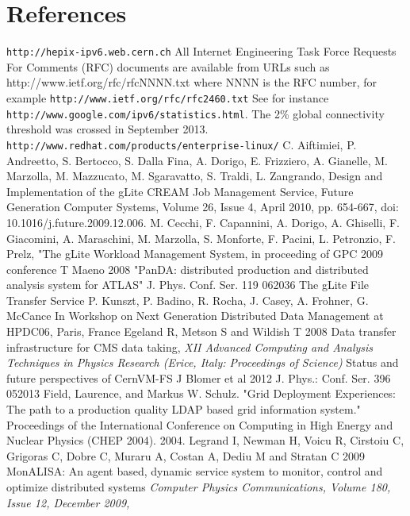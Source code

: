 \section*{References}

\begin{thebibliography}{1}
 {\tt http://hepix-ipv6.web.cern.ch}
 All Internet Engineering Task Force Requests For Comments (RFC) documents are available
from URLs such as http://www.ietf.org/rfc/rfcNNNN.txt where NNNN is the RFC number, for example {\tt http://www.ietf.org/rfc/rfc2460.txt}
 See for instance {\tt http://www.google.com/ipv6/statistics.html}. The 2\% global connectivity threshold was crossed in September 2013.
 {\tt http://www.redhat.com/products/enterprise-linux/}
C. Aiftimiei, P. Andreetto, S. Bertocco, S. Dalla Fina, A. Dorigo, E.
Frizziero, A. Gianelle, M. Marzolla, M. Mazzucato, M. Sgaravatto, S.
Traldi, L. Zangrando, Design and Implementation of the gLite CREAM Job
Management Service, Future Generation Computer Systems, Volume 26, Issue
4, April 2010, pp. 654-667, doi: 10.1016/j.future.2009.12.006.
M. Cecchi, F. Capannini, A. Dorigo, A. Ghiselli, F. Giacomini, A. Maraschini, M. Marzolla, S. Monforte, F. Pacini, L. Petronzio, F. Prelz, "The gLite Workload Management System, in proceeding of GPC 2009 conference
T Maeno 2008 "PanDA: distributed production and distributed analysis
system for ATLAS" J. Phys. Conf. Ser. 119 062036
The gLite File Transfer Service
P. Kunszt, P. Badino, R. Rocha, J. Casey, A. Frohner, G. McCance
In Workshop on Next Generation Distributed Data Management at HPDC06, Paris, France
Egeland R, Metson S and  Wildish T 2008 Data transfer infrastructure for
CMS data taking,  {\it XII Advanced Computing and Analysis Techniques in
Physics Research (Erice, Italy: Proceedings of Science)}
Status and future perspectives of CernVM-FS
J Blomer et al 2012 J. Phys.: Conf. Ser. 396 052013
Field, Laurence, and Markus W. Schulz. "Grid Deployment Experiences: The path to a production quality LDAP based grid information system." Proceedings of the International Conference on Computing in High Energy and Nuclear Physics (CHEP 2004). 2004.
Legrand I, Newman H, Voicu R, Cirstoiu C, Grigoras C, Dobre C, Muraru A,
Costan A, Dediu M and Stratan C 2009 MonALISA: An agent based, dynamic
service system to monitor, control and optimize distributed systems {\it
Computer Physics Communications, Volume 180, Issue 12, December 2009,
}
\end{thebibliography}
